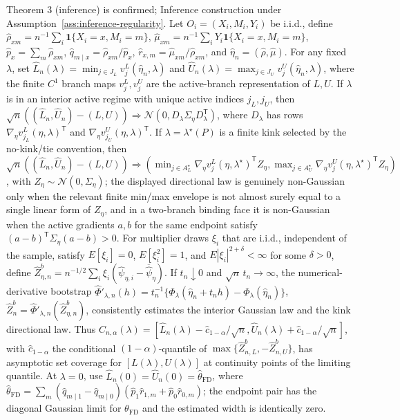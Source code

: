 \documentclass[11pt]{article}
\newcommand{\one}{\mathbf{1}}
\newcommand{\transpose}{\mathsf{T}}
\theoremstyle{definition}
\theoremstyle{plain}
\theoremstyle{remark}
\begin{document}
Theorem 3 (inference) is confirmed; Inference construction under Assumption~\ref{ass:inference-regularity}. Let \(O_i=(X_i,M_i,Y_i)\) be i.i.d., define \(\widehat\rho_{xm}=n^{-1}\sum_i\one\{X_i=x,M_i=m\}\), \(\widehat\mu_{xm}=n^{-1}\sum_iY_i\one\{X_i=x,M_i=m\}\), \(\widehat p_x=\sum_m\widehat\rho_{xm}\), \(\widehat q_{m\mid x}=\widehat\rho_{xm}/\widehat p_x\), \(\widehat r_{x,m}=\widehat\mu_{xm}/\widehat\rho_{xm}\), and \(\widehat\eta_n=(\widehat\rho,\widehat\mu)\). For any fixed \(\lambda\), set \(\widehat L_n(\lambda)=\min_{j\in J_L}v^L_j(\widehat\eta_n,\lambda)\) and \(\widehat U_n(\lambda)=\max_{j\in J_U}v^U_j(\widehat\eta_n,\lambda)\), where the finite \(C^1\) branch maps \(v^L_j,v^U_j\) are the active-branch representation of \(L,U\). If \(\lambda\) is in an interior active regime with unique active indices \(j_L,j_U\), then \(\sqrt n((\widehat L_n,\widehat U_n)-(L,U))\Rightarrow \mathcal N(0,D_\lambda\Sigma_\eta D_\lambda^\transpose)\), where \(D_\lambda\) has rows \(\nabla_\eta v^L_{j_L}(\eta,\lambda)^\transpose\) and \(\nabla_\eta v^U_{j_U}(\eta,\lambda)^\transpose\). If \(\lambda=\lambda^\star(P)\) is a finite kink selected by the no-kink/tie convention, then \(\sqrt n((\widehat L_n,\widehat U_n)-(L,U))\Rightarrow(\min_{j\in A_L^\star}\nabla_\eta v^L_j(\eta,\lambda^\star)^\transpose Z_\eta,\max_{j\in A_U^\star}\nabla_\eta v^U_j(\eta,\lambda^\star)^\transpose Z_\eta)\), with \(Z_\eta\sim\mathcal N(0,\Sigma_\eta)\); the displayed directional law is genuinely non-Gaussian only when the relevant finite min/max envelope is not almost surely equal to a single linear form of \(Z_\eta\), and in a two-branch binding face it is non-Gaussian when the active gradients \(a,b\) for the same endpoint satisfy \((a-b)^\transpose\Sigma_\eta(a-b)>0\). For multiplier draws \(\xi_i\) that are i.i.d., independent of the sample, satisfy \(E[\xi_i]=0\), \(E[\xi_i^2]=1\), and \(E|\xi_i|^{2+\delta}<\infty\) for some \(\delta>0\), define \(\widehat Z_{\eta,n}^b=n^{-1/2}\sum_i\xi_i(\widehat\psi_{\eta,i}-\overline{\widehat\psi}_\eta)\). If \(t_n\downarrow0\) and \(\sqrt n\,t_n\to\infty\), the numerical-derivative bootstrap \(\widehat\Phi'_{\lambda,n}(h)=t_n^{-1}\{\Phi_\lambda(\widehat\eta_n+t_nh)-\Phi_\lambda(\widehat\eta_n)\}\), \(\widehat Z_n^b=\widehat\Phi'_{\lambda,n}(\widehat Z_{\eta,n}^b)\), consistently estimates the interior Gaussian law and the kink directional law. Thus \(C_{n,\alpha}(\lambda)=[\widehat L_n(\lambda)-\widehat c_{1-\alpha}/\sqrt n,\widehat U_n(\lambda)+\widehat c_{1-\alpha}/\sqrt n]\), with \(\widehat c_{1-\alpha}\) the conditional \((1-\alpha)\)-quantile of \(\max\{\widehat Z_{n,L}^b,-\widehat Z_{n,U}^b\}\), has asymptotic set coverage for \([L(\lambda),U(\lambda)]\) at continuity points of the limiting quantile. At \(\lambda=0\), use \(\widehat L_n(0)=\widehat U_n(0)=\widehat\theta_{\mathrm{FD}}\), where \(\widehat\theta_{\mathrm{FD}}=\sum_m(\widehat q_{m\mid1}-\widehat q_{m\mid0})(\widehat p_1\widehat r_{1,m}+\widehat p_0\widehat r_{0,m})\); the endpoint pair has the diagonal Gaussian limit for \(\theta_{\mathrm{FD}}\) and the estimated width is identically zero.
\end{document}
